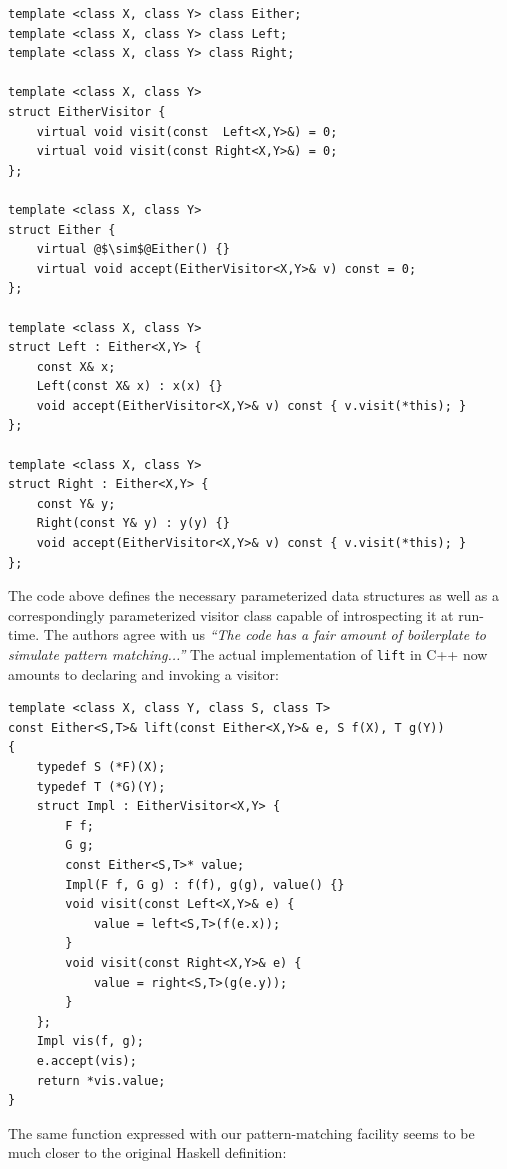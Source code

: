 \documentclass[preprint]{sigplanconf}
\DeclareRobustCommand{\codehaskell}[1]{{\lstinline[breaklines=false,language=Haskell]{#1}}}
\begin{document}
\begin{lstlisting}
template <class X, class Y> class Either;
template <class X, class Y> class Left;
template <class X, class Y> class Right;

template <class X, class Y>
struct EitherVisitor {
    virtual void visit(const  Left<X,Y>&) = 0;
    virtual void visit(const Right<X,Y>&) = 0;
};

template <class X, class Y>
struct Either {
    virtual @$\sim$@Either() {}
    virtual void accept(EitherVisitor<X,Y>& v) const = 0;
};

template <class X, class Y>
struct Left : Either<X,Y> {
    const X& x;
    Left(const X& x) : x(x) {}
    void accept(EitherVisitor<X,Y>& v) const { v.visit(*this); }
};

template <class X, class Y>
struct Right : Either<X,Y> {
    const Y& y;
    Right(const Y& y) : y(y) {}
    void accept(EitherVisitor<X,Y>& v) const { v.visit(*this); }
};
\end{lstlisting}

The code above defines the necessary parameterized data structures as well as a 
correspondingly parameterized visitor class capable of introspecting it at 
run-time. The authors agree with us \emph{``The code has a fair amount of 
boilerplate to simulate pattern matching...''} The actual implementation of 
\codehaskell{lift} in C++ now amounts to declaring and invoking a visitor:

\begin{lstlisting}
template <class X, class Y, class S, class T>
const Either<S,T>& lift(const Either<X,Y>& e, S f(X), T g(Y))
{
    typedef S (*F)(X);
    typedef T (*G)(Y);
    struct Impl : EitherVisitor<X,Y> {
        F f;
        G g;
        const Either<S,T>* value;
        Impl(F f, G g) : f(f), g(g), value() {}
        void visit(const Left<X,Y>& e) {
            value = left<S,T>(f(e.x));
        }
        void visit(const Right<X,Y>& e) {
            value = right<S,T>(g(e.y));
        }
    };
    Impl vis(f, g);
    e.accept(vis);
    return *vis.value;
}
\end{lstlisting}

The same function expressed with our pattern-matching facility seems to be much 
closer to the original Haskell definition:

\end{document}

